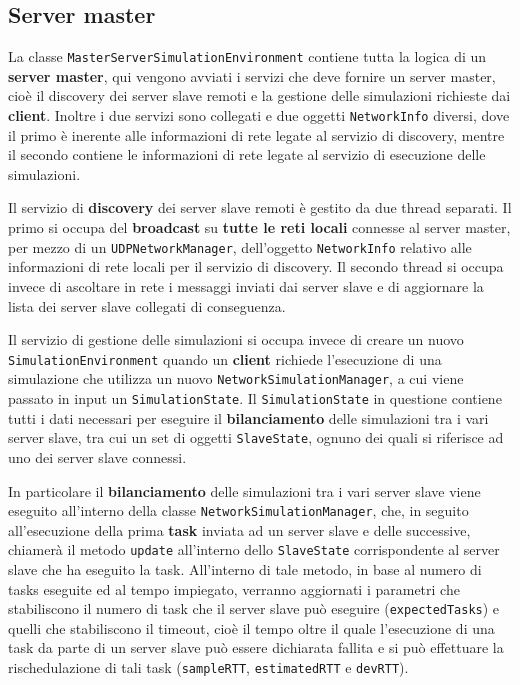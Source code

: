 \subsection{Server master}

La classe \texttt{MasterServerSimulationEnvironment} contiene tutta la logica di un \textbf{server master}, qui vengono avviati i servizi che deve fornire un server master, cioè il discovery dei server slave remoti e la gestione delle simulazioni richieste dai \textbf{client}. Inoltre i due servizi sono collegati e due oggetti \texttt{NetworkInfo} diversi, dove il primo è inerente alle informazioni di rete legate al servizio di discovery, mentre il secondo contiene le informazioni di rete legate al servizio di esecuzione delle simulazioni.

Il servizio di \textbf{discovery} dei server slave remoti è gestito da due thread separati. Il primo si occupa del \textbf{broadcast} su \textbf{tutte le reti locali} connesse al server master, per mezzo di un \texttt{UDPNetworkManager}, dell'oggetto \texttt{NetworkInfo} relativo alle informazioni di rete locali per il servizio di discovery. Il secondo thread si occupa invece di ascoltare in rete i messaggi inviati dai server slave e di aggiornare la lista dei server slave collegati di conseguenza.

Il servizio di gestione delle simulazioni si occupa invece di creare un nuovo \texttt{SimulationEnvironment} quando un \textbf{client} richiede l'esecuzione di una simulazione che utilizza un nuovo \texttt{NetworkSimulationManager}, a cui viene passato in input un \texttt{SimulationState}. Il \texttt{SimulationState} in questione contiene tutti i dati necessari per eseguire il \textbf{bilanciamento} delle simulazioni tra i vari server slave, tra cui un set di oggetti \texttt{SlaveState}, ognuno dei quali si riferisce ad uno dei server slave connessi.

In particolare il \textbf{bilanciamento} delle simulazioni tra i vari server slave viene eseguito all'interno della classe \texttt{NetworkSimulationManager}, che, in seguito all'esecuzione della prima \textbf{task} inviata ad un server slave e delle successive, chiamerà il metodo \texttt{update} all'interno dello \texttt{SlaveState} corrispondente al server slave che ha eseguito la task. All'interno di tale metodo, in base al numero di tasks eseguite ed al tempo impiegato, verranno aggiornati i parametri che stabiliscono il numero di task che il server slave può eseguire (\texttt{expectedTasks}) e quelli che stabiliscono il timeout, cioè il tempo oltre il quale l'esecuzione di una task da parte di un server slave può essere dichiarata fallita e si può effettuare la rischedulazione di tali task (\texttt{sampleRTT}, \texttt{estimatedRTT} e \texttt{devRTT}).

